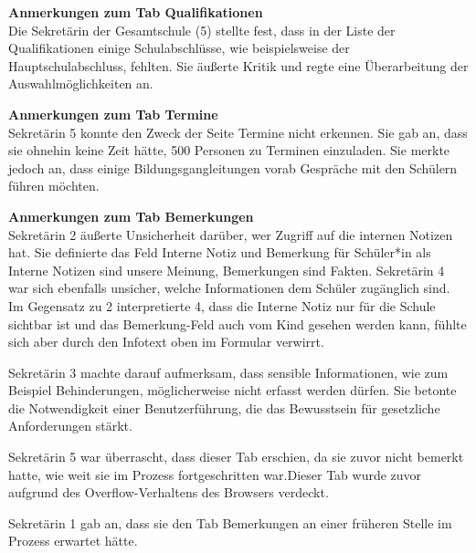 \textbf{Anmerkungen zum Tab \glqq Qualifikationen\grqq{}}\\
Die Sekretärin der Gesamtschule (5) stellte fest, dass in der Liste der Qualifikationen einige Schulabschlüsse, wie beispielsweise der Hauptschulabschluss, fehlten. Sie äußerte Kritik und regte eine Überarbeitung der Auswahlmöglichkeiten an.

\textbf{Anmerkungen zum Tab \glqq Termine\grqq{}}\\
Sekretärin 5 konnte den Zweck der Seite \glqq Termine\grqq{} nicht erkennen. Sie gab an, dass sie ohnehin keine Zeit hätte, 500 Personen zu Terminen einzuladen. Sie merkte jedoch an, dass einige Bildungsgangleitungen vorab Gespräche mit den Schülern führen möchten.

\textbf{Anmerkungen zum Tab \glqq Bemerkungen\grqq{}}\\
Sekretärin 2 äußerte Unsicherheit darüber, wer Zugriff auf die internen Notizen hat. Sie definierte das Feld \glqq Interne Notiz\grqq{} und \glqq Bemerkung für Schüler*in\grqq{} als \glqq Interne Notizen sind unsere Meinung, Bemerkungen sind Fakten\grqq{}. Sekretärin 4 war sich ebenfalls unsicher, welche Informationen dem Schüler zugänglich sind. Im Gegensatz zu 2 interpretierte 4, dass die \glqq Interne Notiz\grqq{} nur für die Schule sichtbar ist und das \glqq Bemerkung\grqq{}-Feld auch vom Kind gesehen werden kann, fühlte sich aber durch den Infotext oben im Formular verwirrt.

Sekretärin 3 machte darauf aufmerksam, dass sensible Informationen, wie zum Beispiel Behinderungen, möglicherweise nicht erfasst werden dürfen. Sie betonte die Notwendigkeit einer Benutzerführung, die das Bewusstsein für gesetzliche Anforderungen stärkt.

Sekretärin 5 war überrascht, dass dieser Tab erschien, da sie zuvor nicht bemerkt hatte, wie weit sie im Prozess fortgeschritten war.Dieser Tab wurde zuvor aufgrund des Overflow-Verhaltens des Browsers verdeckt.

Sekretärin 1 gab an, dass sie den Tab \glqq Bemerkungen\grqq{} an einer früheren Stelle im Prozess erwartet hätte.

